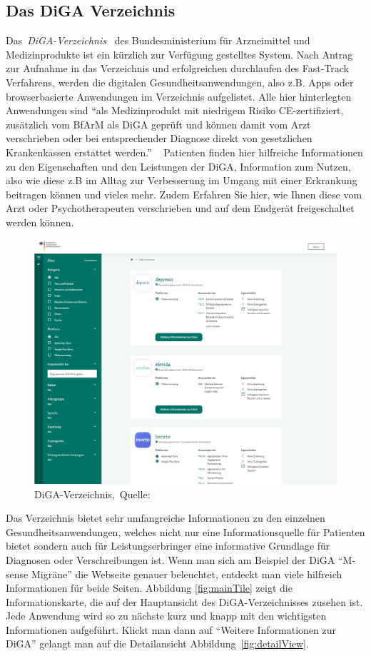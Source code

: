\subsection{Das DiGA Verzeichnis}
Das~\textit{DiGA-Verzeichnis}~\cite{digaverzeichnis} des Bundesministerium für Arzneimittel und Medizinprodukte ist ein kürzlich zur Verfügung gestelltes System. Nach Antrag zur Aufnahme in das Verzeichnis und erfolgreichen durchlaufen des Fast-Track Verfahrens, werden die digitalen Gesundheitsanwendungen, also z.B. Apps oder browserbasierte Anwendungen im Verzeichnis aufgelistet. Alle hier hinterlegten Anwendungen sind ``als Medizinprodukt mit niedrigem Risiko CE-zertifiziert, zusätzlich vom BfArM als DiGA geprüft und können damit vom Arzt verschrieben oder bei entsprechender Diagnose direkt von gesetzlichen Krankenkassen erstattet werden.'' ~\cite{digaNutzer}
Patienten finden hier hilfreiche Informationen zu den Eigenschaften und den Leistungen der DiGA, Information zum Nutzen, also wie diese z.B im Alltag zur Verbesserung im Umgang mit einer Erkrankung beitragen können und vieles mehr. Zudem Erfahren Sie hier, wie Ihnen diese vom Arzt oder Psychotherapeuten verschrieben und auf dem Endgerät freigeschaltet werden können.
\begin{figure}[H]
	\centering
	\includegraphics[width=450px, keepaspectratio]{assets/digaVerzeichnis.png}
	\caption[DiGA-Verzeichnis]{DiGA-Verzeichnis,~Quelle:~\cite{digaverzeichnis}}
	\label{fig:digaverzeichnis}
\end{figure}
Das Verzeichnis bietet sehr umfangreiche Informationen zu den einzelnen Gesundheitsanwendungen, welches nicht nur eine Informationsquelle für Patienten bietet sondern auch für Leistungserbringer eine informative Grundlage für Diagnosen oder Verschreibungen ist. Wenn man sich am Beispiel der DiGA ``M-sense Migräne'' die Webseite genauer beleuchtet, entdeckt man viele hilfreich Informationen für beide Seiten. Abbildung \ref{fig:mainTile} zeigt die Informationskarte, die auf der Hauptansicht des DiGA-Verzeichnisses zusehen ist. Jede Anwendung wird so zu nächste kurz und knapp mit den wichtigsten Informationen aufgeführt. Klickt man dann auf ``Weitere Informationen zur DiGA'' gelangt man auf die Detailansicht Abbildung~\ref{fig:detailView}.
